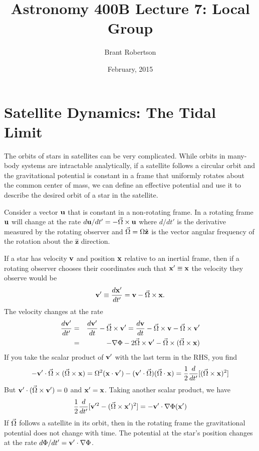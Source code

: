\documentclass[]{article}
\title{Astronomy 400B Lecture 7: Local Group }
\author{Brant Robertson}
\date{February, 2015}
\begin{document}
\maketitle


\section{Satellite Dynamics: The Tidal Limit}

The orbits of stars in satellites can be very complicated.
While orbits in many-body systems are intractable analytically,
if a satellite follows a circular orbit and the
gravitational potential is constant in a frame that
uniformly rotates about the common center of mass, we
can define an effective potential and use it to 
describe the desired orbit of a star in the satellite.

Consider a vector $\mathbf{u}$ that is constant in a 
non-rotating frame. In a rotating frame $\mathbf{u}$
will change at the rate $d\mathbf{u}/dt' = -\vec{\Omega} \times \mathbf{u}$
where $d/dt'$ is the derivative measured by
the rotating observer and $\vec{\Omega} = \Omega\hat{\mathbf{z}}$ is the
vector angular frequency of the rotation about the $\hat{\mathbf{z}}$
direction.

If a star has velocity $\mathbf{v}$ and position $\mathbf{x}$ relative to an inertial
frame, then if a rotating observer chooses their coordinates such that
$\mathbf{x}'\equiv\mathbf{x}$ the velocity they observe would be
\begin{equation}
\mathbf{v}' \equiv \frac{d\mathbf{x}'}{dt'} = \mathbf{v} - \vec{\Omega} \times \mathbf{x}.
\end{equation}
\noindent
The velocity changes at the rate
\begin{eqnarray}
\frac{d\mathbf{v}'}{dt'} &=& \frac{d\mathbf{v}'}{dt} - \vec{\Omega} \times \mathbf{v}' = \frac{d\mathbf{v}}{dt} - \vec{\Omega} \times \mathbf{v} - \vec{\Omega} \times \mathbf{v}'\nonumber\\
&=& - \nabla \Phi - 2 \vec{\Omega} \times \mathbf{v}' - \vec{\Omega}\times(\vec{\Omega} \times \mathbf{x})
\end{eqnarray}
\noindent
If you take the scalar product of $\mathbf{v}'$ with the last term in the RHS, you find
\begin{equation}
-\mathbf{v}'\cdot\vec{\Omega}\times(\vec{\Omega} \times \mathbf{x}) = \Omega^2(\mathbf{x}\cdot\mathbf{v}') - (\mathbf{v}'\cdot\vec{\Omega})(\vec{\Omega}\cdot\mathbf{x}) = \frac{1}{2}\frac{d}{dt'}[(\vec{\Omega}\times\mathbf{x})^2]
\end{equation}
\noindent
But $\mathbf{v}'\cdot(\vec{\Omega}\times\mathbf{v}')=0$ and $\mathbf{x}'=\mathbf{x}$.  Taking another scalar product, we have
\begin{equation}
\label{eqn:KE_mod}
\frac{1}{2}\frac{d}{dt'}[\mathbf{v}'^2 - (\vec{\Omega} \times \mathbf{x}')^2] = -\mathbf{v}' \cdot \nabla\Phi(\mathbf{x}')
\end{equation}
If $\vec{\Omega}$ follows a satellite in its orbit, then in the rotating frame the gravitational
potential does not change with time. The potential at the star's position
changes at the rate $d\Phi/dt' = \mathbf{v}'\cdot\nabla\Phi$.
\end{document}
